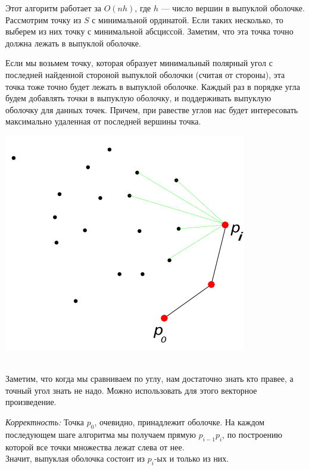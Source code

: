Этот алгоритм работает за $O (nh)$, где $h$ — число вершин в выпуклой оболочке. Рассмотрим точку из $S$ с минимальной ординатой. Если таких несколько, то выберем из них точку с минимальной абсциссой. Заметим, что эта точка точно должна лежать в выпуклой оболочке.

Если мы возьмем точку, которая образует минимальный полярный угол с последней найденной стороной выпуклой оболочки (считая от стороны), эта точка тоже точно будет лежать в выпуклой оболочке.
Каждый раз в порядке угла будем добавлять точки в выпуклую оболочку, и поддерживать
выпуклую оболочку для данных точек. Причем, при равестве углов нас будет интересовать максимально удаленная от последней вершины точка.

\begin{minipage}[r]{0.2\linewidth} 
    \includegraphics[width=2\linewidth]{images/45_1.png}
\end{minipage} \\

Заметим, что когда мы сравниваем по углу, нам достаточно знать кто правее, а точный угол знать не надо. Можно использовать для этого векторное произведение.

\textit{Корректность:} Точка $p_0$, очевидно, принадлежит оболочке. На каждом последующем шаге алгоритма мы получаем прямую $p_{i-1}p_i$, по построению которой все точки множества лежат слева от нее.\\
Значит, выпуклая оболочка состоит из $p_i$-ых и только из них.\\

